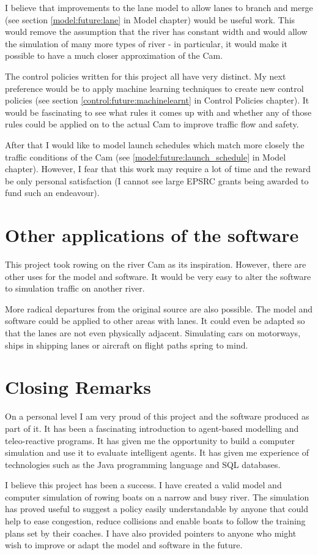   I believe that improvements to the lane model to allow lanes to branch and merge (see section \ref{model:future:lane} in Model chapter) would be useful work. This would remove the assumption that the river has constant width and would allow the simulation of many more types of river - in particular, it would make it possible to have a much closer approximation of the Cam.
  
  The control policies written for this project all have very distinct. My next preference would be to apply machine learning techniques to create new control policies (see section \ref{control:future:machinelearnt} in Control Policies chapter). It would be fascinating to see what rules it comes up with and whether any of those rules could be applied on to the actual Cam to improve traffic flow and safety.
  
  After that I would like to model launch schedules which match more closely the traffic conditions of the Cam (see \ref{model:future:launch_schedule} in Model chapter). However, I fear that this work may require a lot of time and the reward be only personal satisfaction (I cannot see large EPSRC grants being awarded to fund such an endeavour).
  
  \section{Other applications of the software}
  This project took rowing on the river Cam as its inspiration. However, there are other uses for the model and software. It would be very easy to alter the software to simulation traffic on another river.
  
  More radical departures from the original source are also possible. The model and software could be applied to other areas with lanes. It could even be adapted so that the lanes are not even physically adjacent. Simulating cars on motorways, ships in shipping lanes or aircraft on flight paths spring to mind.

  \section{Closing Remarks}
  On a personal level I am very proud of this project and the software produced as part of it. It has been a fascinating introduction to agent-based modelling and teleo-reactive programs. It has given me the opportunity to build a computer simulation and use it to evaluate intelligent agents. It has given me experience of technologies such as the Java programming language and SQL databases.
  
  I believe this project has been a success. I have created a valid model and computer simulation of rowing boats on a narrow and busy river. The simulation has proved useful to suggest a policy easily understandable by anyone that could help to ease congestion, reduce collisions and enable boats to follow the training plans set by their coaches. I have also provided pointers to anyone who might wish to improve or adapt the model and software in the future.

  